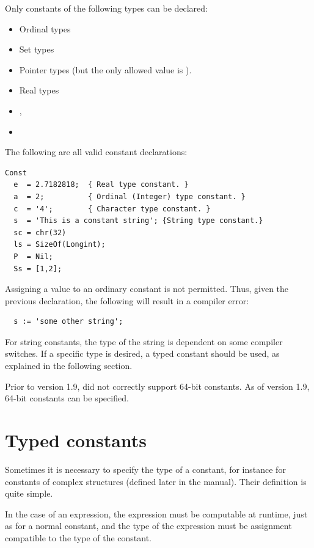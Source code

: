 Only constants of the following types can be declared:

\begin{itemize}
\item Ordinal types
\item Set types
\item Pointer types (but the only allowed value is ).
\item Real types
\item {},
\item {}
\end{itemize}

The following are all valid constant declarations:
\begin{verbatim}
Const
  e  = 2.7182818;  { Real type constant. }
  a  = 2;          { Ordinal (Integer) type constant. }
  c  = '4';        { Character type constant. }
  s  = 'This is a constant string'; {String type constant.}
  sc = chr(32)
  ls = SizeOf(Longint);
  P  = Nil;
  Ss = [1,2];
\end{verbatim}
Assigning a value to an ordinary constant is not permitted.
Thus, given the previous declaration, the following will result
in a compiler error:
\begin{verbatim}
  s := 'some other string';
\end{verbatim}
For string constants, the type of the string is dependent on some compiler
switches. If a specific type is desired, a typed constant should be used,
as explained in the following section.

Prior to version 1.9, \fpc did not correctly support 64-bit constants. As
of version 1.9, 64-bit constants can be specified.

\section{Typed constants}
\label{se:typedconstants}
Sometimes it is necessary to specify the type of a constant, for instance
for constants of complex structures (defined later in the manual).
Their definition is quite simple.


In the case of an expression, the expression must be computable at runtime, 
just as for a normal constant, and the type of the expression must be assignment 
compatible to the type of the constant.


